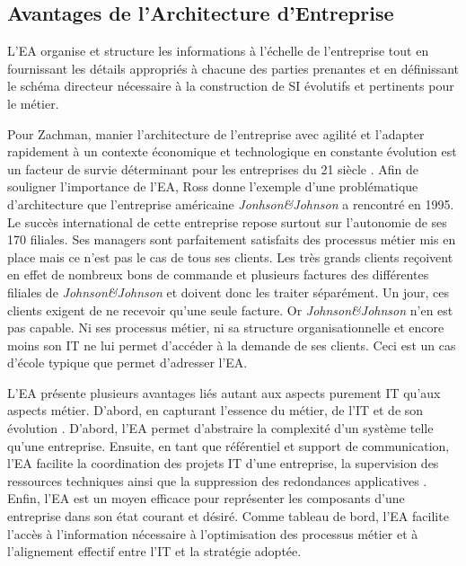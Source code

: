 
\subsection{Avantages de l'Architecture d'Entreprise}

L'EA organise et structure les informations à l'échelle de l'entreprise tout en
fournissant les détails appropriés à chacune des parties prenantes et en
définissant le schéma directeur nécessaire à la construction de SI évolutifs et
pertinents pour le métier. 


Pour Zachman, manier l'architecture de l'entreprise avec agilité et l'adapter
rapidement à un contexte économique et technologique en constante évolution est
un facteur de survie déterminant pour les entreprises du 21 siècle
\cite{zachman1997enterprise}. Afin de souligner l'importance de l'EA, Ross
\cite{rossyoutube} donne l'exemple d'une problématique d'architecture que
l'entreprise américaine \textit{Jonhson\&Johnson} a rencontré en 1995. Le
succès international de cette entreprise repose surtout sur l'autonomie de ses
170 filiales. Ses managers sont parfaitement satisfaits des processus métier
mis en place mais ce n'est pas le cas de tous ses clients. Les très grands
clients reçoivent en effet de nombreux bons de commande et plusieurs factures
des différentes filiales de \textit{Johnson\&Johnson} et doivent donc les
traiter séparément.  Un jour, ces clients exigent de ne recevoir qu'une seule
facture. Or \textit{Johnson\&Johnson} n'en est pas capable. Ni ses processus
métier, ni sa structure organisationnelle et encore moins son IT ne lui permet
d'accéder à la demande de ses clients. Ceci est un cas d'école typique que
permet d'adresser l'EA.

L'EA présente plusieurs avantages liés autant aux aspects purement IT qu'aux
aspects métier. D'abord, en capturant l'essence du métier, de l'IT et de son
évolution \cite{lankhorst2013enterprise}. D'abord, l'EA permet d'abstraire la
complexité d'un système telle qu'une entreprise. Ensuite, en tant que
référentiel et support de communication, l'EA facilite la coordination des
projets IT d'une entreprise, la supervision des ressources techniques ainsi que
la suppression des redondances applicatives \cite{shah2007frameworks}. Enfin,
l'EA est un moyen efficace pour représenter les composants d'une entreprise
dans son état courant et désiré. Comme tableau de bord, l'EA facilite l'accès à
l'information nécessaire à l'optimisation des processus métier et à
l'alignement effectif entre l'IT et la stratégie adoptée. 

